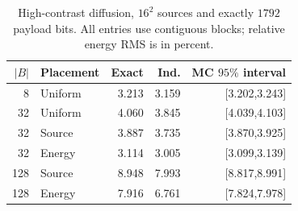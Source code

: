 \begin{table}[tb]
\centering
\caption{High-contrast diffusion, $16^2$ sources and exactly $1792$ payload
bits. All entries use contiguous blocks; relative energy RMS is in percent.}
\label{tab:revision-highcontrast}
\begingroup\footnotesize\setlength{\tabcolsep}{5pt}
\begin{tabular}{rlrrr}
\toprule
$|B|$ & Placement & Exact & Ind. & MC $95\%$ interval\\
\midrule
8 & Uniform & 3.213 & 3.159 & [3.202,3.243] \\
32 & Uniform & 4.060 & 3.845 & [4.039,4.103] \\
32 & Source & 3.887 & 3.735 & [3.870,3.925] \\
32 & Energy & 3.114 & 3.005 & [3.099,3.139] \\
128 & Source & 8.948 & 7.993 & [8.817,8.991] \\
128 & Energy & 7.916 & 6.761 & [7.824,7.978] \\
\bottomrule
\end{tabular}\endgroup
\end{table}
